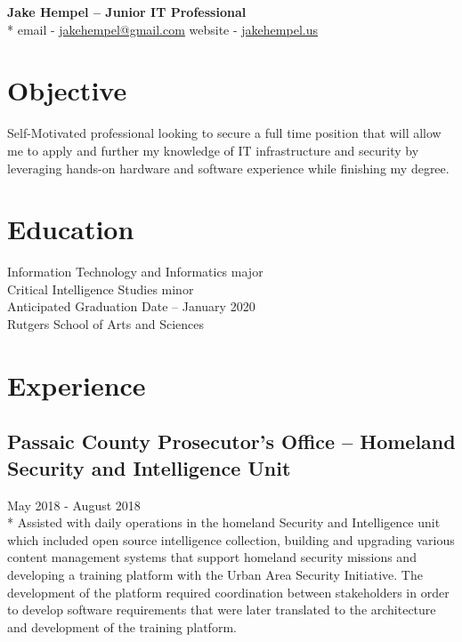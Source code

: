 \documentclass{article}
\begin{document}
\begin{samepage}
\begin{center}
\huge{\textbf{Jake Hempel -- Junior IT Professional}} \\*
\large{email - \href{mailto:jakehempel@gmail.com}{jakehempel@gmail.com}
website - \href{jakehempel.us}{jakehempel.us}}
\end{center}

\section{Objective}
Self-Motivated professional looking to secure a full time position that will allow me to apply and further my knowledge of IT infrastructure and security by leveraging hands-on hardware and software experience while finishing my degree.


\section{Education}
Information Technology and Informatics major\\
Critical Intelligence Studies minor\\
Anticipated Graduation Date -- January 2020\\
Rutgers School of Arts and Sciences


\section{Experience}

\subsection{Passaic County Prosecutor's Office -- Homeland Security and Intelligence Unit}
May 2018 - August 2018\\*
Assisted with daily operations in the homeland Security and Intelligence unit which included open source intelligence collection, building and upgrading various content management systems that support homeland security missions and developing a training platform with the Urban Area Security Initiative.  The development of the platform required coordination between stakeholders in order to develop software requirements that were later translated to the architecture and development of the training platform.


\end{samepage}
\end{document}
